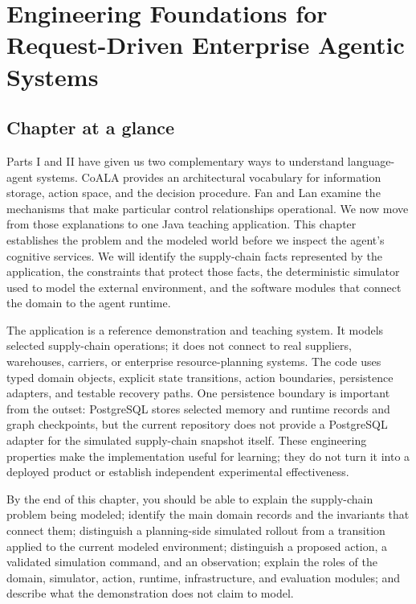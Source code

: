 \chapter{Engineering Foundations for Request-Driven Enterprise Agentic Systems}
\label{ch:engineering-foundations}

\section*{Chapter at a glance}
{}

Parts I and II have given us two complementary ways to understand language-agent systems. CoALA provides an architectural vocabulary for information storage, action space, and the decision procedure. Fan and Lan examine the mechanisms that make particular control relationships operational. We now move from those explanations to one Java teaching application. This chapter establishes the problem and the modeled world before we inspect the agent's cognitive services. We will identify the supply-chain facts represented by the application, the constraints that protect those facts, the deterministic simulator used to model the external environment, and the software modules that connect the domain to the agent runtime.

The application is a reference demonstration and teaching system. It models selected supply-chain operations; it does not connect to real suppliers, warehouses, carriers, or enterprise resource-planning systems. The code uses typed domain objects, explicit state transitions, action boundaries, persistence adapters, and testable recovery paths. One persistence boundary is important from the outset: PostgreSQL stores selected memory and runtime records and graph checkpoints, but the current repository does not provide a PostgreSQL adapter for the simulated supply-chain snapshot itself. These engineering properties make the implementation useful for learning; they do not turn it into a deployed product or establish independent experimental effectiveness.

\begin{learningbox}
By the end of this chapter, you should be able to explain the supply-chain problem being modeled; identify the main domain records and the invariants that connect them; distinguish a planning-side simulated rollout from a transition applied to the current modeled environment; distinguish a proposed action, a validated simulation command, and an observation; explain the roles of the domain, simulator, action, runtime, infrastructure, and evaluation modules; and describe what the demonstration does not claim to model.
\end{learningbox}

